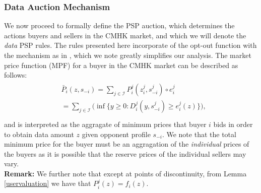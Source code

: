\documentclass[12pt]{article}
\theoremstyle{definition}
\newcommand{\mcI}{\mathcal{I}}
\begin{document}
\begin{multicols}{2}
\subsubsection{Data Auction Mechanism}\label{datamechanism}
We now proceed to formally define the PSP auction, which determines the actions 
buyers and sellers in the CMHK market, and which we will denote the \emph{data}
PSP rules. The rules presented here incorporate of the opt-out function with the
mechanism as in \cite{lazar}, which we note greatly simplifies our
analysis. 
The market price function (MPF) for a buyer in the CMHK market
can be described as follows:
\begin{align}\label{dataprice}
\begin{split}
    &\bar{P}_i(z, s_{-i}) =\displaystyle\sum_{j\in\mcI}P_i^j(z_i^j,
s_{-i}^j) \circ e_i^j \\
    &= \sum_{j\in\mcI}\bigg(\inf\bigg\lbrace y\ge 0 : 
    {D_i^j}(y,s_{-i}^j) \ge e_i^j(z) \bigg\rbrace \bigg),\\
\end{split}
\end{align}
and is interpreted as the aggragate of minimum prices that buyer $i$ bids in
order to obtain
data amount $z$ given opponent profile $s_{-i}$. We note that
the total minimum price for the buyer must be an aggragation of the
\emph{individual} prices of the buyers as it is possible that the reserve prices
of the individual sellers may vary.\\
\textbf{Remark:} We further note that except at points of discontinuity, from
Lemma \ref{uservaluation} we have that $P_i^j(z) = f_i(z)$. \\


\end{multicols}
\end{document}
